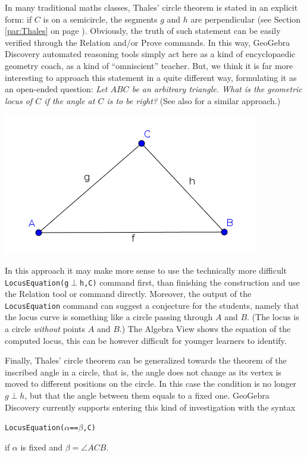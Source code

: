 \documentclass{article}
\begin{document}
In many traditional maths classes, Thales' circle theorem is stated in an explicit form: if $C$ is on a semicircle, the segments $g$ and $h$ are perpendicular (see Section \ref{par:Thales} on page
\pageref{par:Thales}). Obviously,  the truth of such statement can be easily verified through the Relation and/or Prove commands. In this way, GeoGebra Discovery automated reasoning tools simply act here as a kind of encyclopaedic geometry coach, as a kind of ``omniscient'' teacher.  But, we think it is far more interesting to approach this statement in a quite different way, formulating it as an open-ended question: \textit{Let $ABC$ be an arbitrary triangle. What is the geometric locus of $C$ if the angle at $C$ is to be right?} (See also
\cite{Artigue} for a similar approach.)
\begin{center}
\includegraphics[scale=0.5]{Thales-triangle}
\end{center}
In this approach it may make more sense to use the technically more difficult \texttt{LocusEquation(g$\perp$h,C)} command first, than finishing the construction and use the Relation tool or command directly. Moreover, the output of the \texttt{LocusEquation} command can suggest a conjecture for the students, namely that the locus curve is something like a circle passing through $A$ and $B$. (The locus
is a circle \textit{without} points $A$ and $B$.) The Algebra View shows the equation of the
computed locus, this can be however difficult for younger learners to identify.

Finally, Thales' circle theorem can be generalized towards the theorem of the inscribed angle in a circle,
that is, the angle does not change as its vertex is moved to different positions on the circle.
In this case the condition is no longer $g\perp h$, but that the angle between them equals to a fixed one. GeoGebra Discovery currently supports entering this kind of investigation with the syntax
\begin{center}
\texttt{LocusEquation($\alpha$==$\beta$,C)}
\end{center}
if $\alpha$ is fixed and $\beta=\angle{ACB}$.
\end{document}
